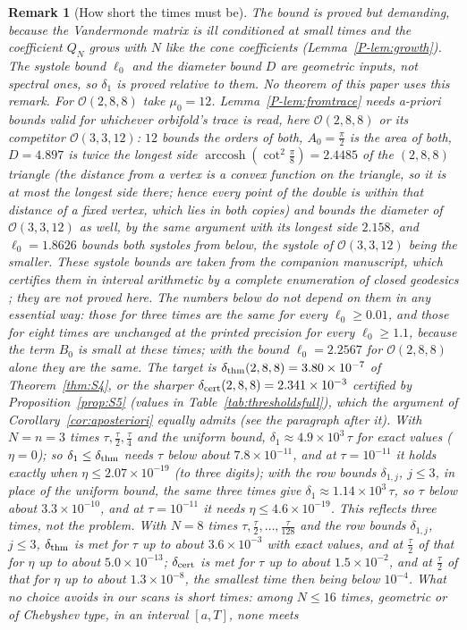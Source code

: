 \documentclass[pdflatex,sn-mathphys-num]{sn-jnl}
\newcommand{\Orb}{\mathcal{O}}
\newcommand{\pref}[1]{\ref*{P-#1}}%
\theoremstyle{thmstyleone}%
\theoremstyle{thmstylethree}%
\newtheorem{remark}[proposition]{Remark}%
\providecommand{\Orb}{\mathcal{O}}
\begin{document}
\begin{remark}[How short the times must be]\label{rem:fromtrace}
The bound is proved but demanding, because the Vandermonde matrix is ill conditioned at small times and the coefficient $Q_N$ grows with $N$ like the cone coefficients (Lemma~\pref{lem:growth}). The systole bound $\ell_0$ and the diameter bound $D$ are geometric inputs, not spectral ones, so $\delta_1$ is proved relative to them. No theorem of this paper uses this remark. For $\Orb(2,8,8)$ take $\mu_0=12$. Lemma~\pref{lem:fromtrace} needs a-priori bounds valid for whichever orbifold's trace is read, here $\Orb(2,8,8)$ or its competitor $\Orb(3,3,12)$: $12$ bounds the orders of both, $A_0=\frac\pi2$ is the area of both, $D=4.897$ is twice the longest side $\operatorname{arccosh}(\cot^2\frac\pi8)=2.4485$ of the $(2,8,8)$ triangle (the distance from a vertex is a convex function on the triangle, so it is at most the longest side there; hence every point of the double is within that distance of a fixed vertex, which lies in both copies) and bounds the diameter of $\Orb(3,3,12)$ as well, by the same argument with its longest side $2.158$, and $\ell_0=1.8626$ bounds both systoles from below, the systole of $\Orb(3,3,12)$ being the smaller. These systole bounds are taken from the companion manuscript, which certifies them in interval arithmetic by a complete enumeration of closed geodesics \cite[Section~7.1]{companionB}; they are not proved here. The numbers below do not depend on them in any essential way: those for three times are the same for every $\ell_0\ge0.01$, and those for eight times are unchanged at the printed precision for every $\ell_0\ge1.1$, because the term $B_0$ is small at these times; with the bound $\ell_0=2.2567$ for $\Orb(2,8,8)$ alone they are the same. The target is $\delta_{\rm thm}(2,8,8)=3.80\times10^{-7}$ of Theorem~\ref{thm:S4}, or the sharper $\delta_{\rm cert}(2,8,8)=2.341\times10^{-3}$ certified by Proposition~\ref{prop:S5} (values in Table~\ref{tab:thresholdsfull}), which the argument of Corollary~\ref{cor:aposteriori} equally admits (see the paragraph after it). With $N=n=3$ times $\tau,\frac\tau2,\frac\tau4$ and the uniform bound, $\delta_1\approx4.9\times10^3\,\tau$ for exact values ($\eta=0$); so $\delta_1\le\delta_{\rm thm}$ needs $\tau$ below about $7.8\times10^{-11}$, and at $\tau=10^{-11}$ it holds exactly when $\eta\le2.07\times10^{-19}$ (to three digits); with the row bounds $\delta_{1,j}$, $j\le3$, in place of the uniform bound, the same three times give $\delta_1\approx1.14\times10^3\,\tau$, so $\tau$ below about $3.3\times10^{-10}$, and at $\tau=10^{-11}$ it needs $\eta\le4.6\times10^{-19}$. This reflects three times, not the problem. With $N=8$ times $\tau,\frac\tau2,\dots,\frac\tau{128}$ and the row bounds $\delta_{1,j}$, $j\le3$, $\delta_{\rm thm}$ is met for $\tau$ up to about $3.6\times10^{-3}$ with exact values, and at $\frac\tau2$ of that for $\eta$ up to about $5.0\times10^{-13}$; $\delta_{\rm cert}$ is met for $\tau$ up to about $1.5\times10^{-2}$, and at $\frac\tau2$ of that for $\eta$ up to about $1.3\times10^{-8}$, the smallest time then being below $10^{-4}$. What no choice avoids in our scans is short times: among $N\le16$ times, geometric or of Chebyshev type, in an interval $[a,T]$, none meets 
\end{remark}
\end{document}
